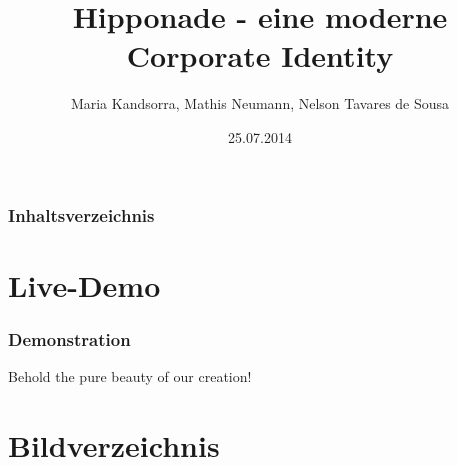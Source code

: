 \documentclass{beamer}
\begin{document}
\title{Hipponade - eine moderne Corporate Identity}  
\author{Maria Kandsorra, Mathis Neumann, Nelson Tavares de Sousa}
\date{25.07.2014} 

\begin{frame}
	\titlepage
\end{frame} 

\begin{frame}
	\frametitle{Inhaltsverzeichnis}
	\tableofcontents
\end{frame} 





%





\section{Live-Demo} 
\begin{frame}
	\frametitle{Demonstration} 
	Behold the pure beauty of our creation!
\end{frame}

\section{Bildverzeichnis}
\begin{frame}
	\listoffigures
\end{frame}
\end{document}
